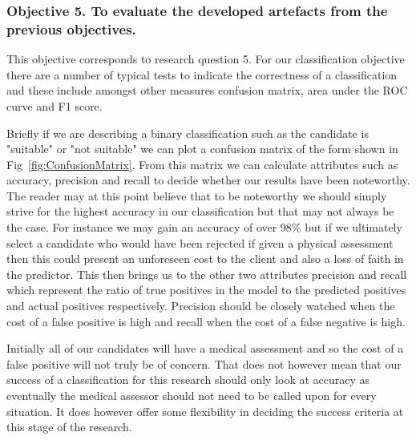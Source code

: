 \subsubsection{Objective 5. To evaluate the developed artefacts from the previous objectives.}

This objective corresponds to research question 5. For our classification objective there are a number of typical tests to indicate the correctness of a classification and these include amongst other measures confusion matrix, area under the ROC curve and F1 score.




Briefly if we are describing a binary classification such as the candidate is "suitable" or "not suitable" we can plot a confusion matrix of the form shown in Fig~\ref{fig:ConfusionMatrix}. From this matrix we can calculate attributes such as accuracy, precision and recall to decide whether our results have been noteworthy. The reader may at this point believe that to be noteworthy we should simply strive for the highest accuracy in our classification but that may not always be the case. For instance we may gain an accuracy of over 98\% but if we ultimately select a candidate who would have been rejected if given a physical assessment then this could present an unforeseen cost to the client and also a loss of faith in the predictor. This then brings us to the other two attributes precision and recall which represent the ratio of true positives in the model to the predicted positives and actual positives respectively. Precision should be closely watched when the cost of a false positive is high and recall when the cost of a false negative is high.

Initially all of our candidates will have a medical assessment and so the cost of a false positive will not truly be of concern. That does not however mean that our success of a classification for this research should only look at accuracy as eventually the medical assessor should not need to be called upon for every situation. It does however offer some flexibility in deciding the success criteria at this stage of the research.

